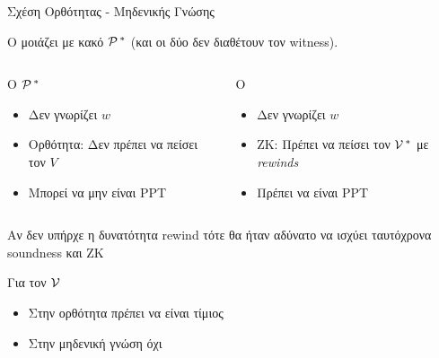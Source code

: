\documentclass[10pt,handout]{beamer}
\begin{document}
\begin{frame}{Σχέση Oρθότητας - Μηδενικής Γνώσης}

O \siml μοιάζει με κακό $\mathcal{P}\,^*$ (και οι δύο δεν διαθέτουν τον witness). \\
\medskip

\begin{columns}

\begin{block}{Ο $\mathcal{P}\,^*$}
	\begin{itemize}
		\item Δεν γνωρίζει $w$
		\item Ορθότητα: Δεν πρέπει να πείσει τον $V$
		\item Μπορεί να μην είναι PPT
	\end{itemize}
\end{block}
 
\begin{block}{Ο \siml}
\begin{itemize}
	\item Δεν γνωρίζει $w$
	\item ΖΚ: Πρέπει να πείσει τον $\mathcal{V}\,^*$ με \emph{rewinds}
	\item Πρέπει να είναι PPT
\end{itemize}
\end{block}
\end{columns}
\alert{Αν δεν υπήρχε η δυνατότητα rewind τότε θα ήταν αδύνατο να ισχύει ταυτόχρονα soundness και ΖΚ}

\medskip
\begin{block}{Για τον $\mathcal{V}\,$}
\begin{itemize}
\item Στην ορθότητα πρέπει να είναι τίμιος
\item Στην μηδενική γνώση όχι
\end{itemize}
\end{block}

\end{frame}
\end{document}
